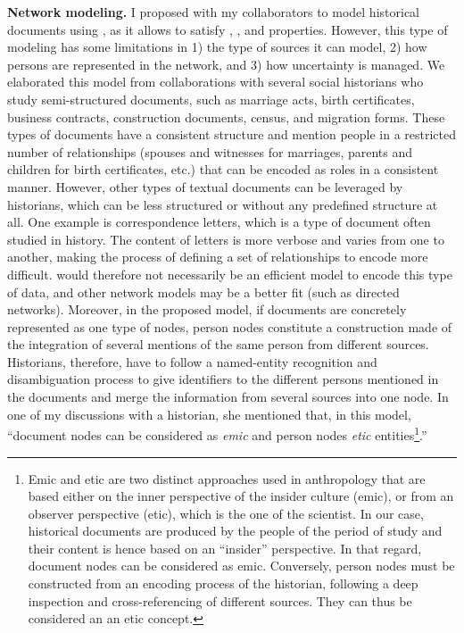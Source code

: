 \noindent\textbf{Network modeling.} I proposed with my collaborators to model historical documents using \modelplural, as it allows to satisfy \traceability, \simplicity, and \reality properties. However, this type of modeling has some limitations in 1) the type of sources it can model, 2) how persons are represented in the network, and 3) how uncertainty is managed.
We elaborated this model from collaborations with several social historians who study semi-structured documents, such as marriage acts, birth certificates, business contracts, construction documents, census, and migration forms.
These types of documents have a consistent structure and mention people in a restricted number of relationships (spouses and witnesses for marriages, parents and children for birth certificates, etc.) that can be encoded as roles in a consistent manner.
However, other types of textual documents can be leveraged by historians, which can be less structured or without any predefined structure at all.
One example is correspondence letters, which is a type of document often studied in history\cite{rollingerCicerosSupplicatioUnd2017, edelsteinHistoricalResearchDigital2017}.
The content of letters is more verbose and varies from one to another, making the process of defining a set of relationships to encode more difficult.
\modelpluralcapital would therefore not necessarily be an efficient model to encode this type of data, and other network models may be a better fit (such as directed networks).
Moreover, in the proposed model, if documents are concretely represented as one type of nodes, person nodes constitute a construction made of the integration of several mentions of the same person from different sources.
Historians, therefore, have to follow a named-entity recognition and disambiguation process to give identifiers to the different persons mentioned in the documents and merge the information from several sources into one node.
In one of my discussions with a historian, she mentioned that, in this model, ``document nodes can be considered as \emph{emic} and person nodes \emph{etic} entities\footnote{Emic and etic are two distinct approaches used in anthropology\cite{headlandEmicsEticsInsider1990} that are based either on the inner perspective of the insider culture (emic), or from an observer perspective (etic), which is the one of the scientist.
In our case, historical documents are produced by the people of the period of study and their content is hence based on an ``insider'' perspective. In that regard, document nodes can be considered as emic.
Conversely, person nodes must be constructed from an encoding process of the historian, following a deep inspection and cross-referencing of different sources. They can thus be considered an an etic concept.}.''

